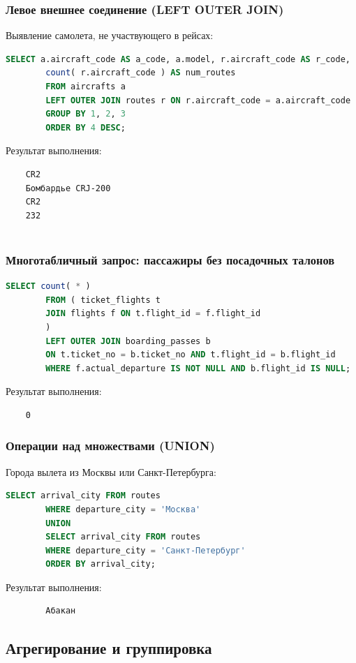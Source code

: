 \documentclass{bmstu-sob}
\begin{document}
	\subsubsection{Левое внешнее соединение (LEFT OUTER JOIN)}
	Выявление самолета, не участвующего в рейсах:
	\begin{lstlisting}[language=SQL]
		SELECT a.aircraft_code AS a_code, a.model, r.aircraft_code AS r_code,
		count( r.aircraft_code ) AS num_routes
		FROM aircrafts a
		LEFT OUTER JOIN routes r ON r.aircraft_code = a.aircraft_code
		GROUP BY 1, 2, 3
		ORDER BY 4 DESC;
	\end{lstlisting}
	Результат выполнения:
	\begin{lstlisting}
	CR2
	Бомбардье CRJ-200
	CR2
	232
	
	\end{lstlisting}
	
	\subsubsection{Многотабличный запрос: пассажиры без посадочных талонов}
	\begin{lstlisting}[language=SQL]
		SELECT count( * )
		FROM ( ticket_flights t
		JOIN flights f ON t.flight_id = f.flight_id
		)
		LEFT OUTER JOIN boarding_passes b
		ON t.ticket_no = b.ticket_no AND t.flight_id = b.flight_id
		WHERE f.actual_departure IS NOT NULL AND b.flight_id IS NULL;
	\end{lstlisting}
	Результат выполнения:
	\begin{lstlisting}
	0
	\end{lstlisting}
	
	\subsubsection{Операции над множествами (UNION)}
	Города вылета из Москвы или Санкт-Петербурга:
	\begin{lstlisting}[language=SQL]
		SELECT arrival_city FROM routes
		WHERE departure_city = 'Москва'
		UNION
		SELECT arrival_city FROM routes
		WHERE departure_city = 'Санкт-Петербург'
		ORDER BY arrival_city;
	\end{lstlisting}
	Результат выполнения:
	\begin{lstlisting}
		Абакан
	\end{lstlisting}
	
	\subsection{Агрегирование и группировка}
	
\end{document}
